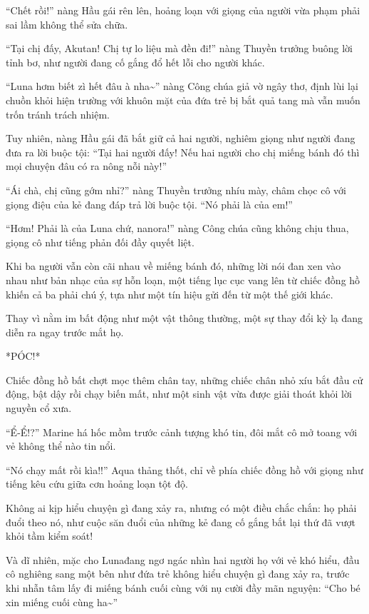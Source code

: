 \documentclass[../main.tex]{subfiles}
\begin{document}
``Chết rồi!'' nàng Hầu gái rên lên, hoảng loạn với giọng của người vừa phạm phải sai lầm không thể sửa chữa.

``Tại chị đấy, Akutan! Chị tự lo liệu mà đền đi!'' nàng Thuyền trưởng buông lời tỉnh bơ, như người đang cố gắng đổ hết lỗi cho người khác.

``Luna hơm biết zì hết đâu à nha\~{}'' nàng Công chúa giả vờ ngây thơ, định lùi lại chuồn khỏi hiện trường với khuôn mặt của đứa trẻ bị bắt quả tang mà vẫn muốn trốn tránh trách nhiệm.

Tuy nhiên, nàng Hầu gái đã bắt giữ cả hai người, nghiêm giọng như người đang đưa ra lời buộc tội: ``Tại hai người đấy! Nếu hai người cho chị miếng bánh đó thì mọi chuyện đâu có ra nông nỗi này!''

``Ái chà, chị cũng gớm nhỉ?'' nàng Thuyền trưởng nhíu mày, châm chọc cô với giọng điệu của kẻ đang đáp trả lời buộc tội. ``Nó phải là của em!''

``Hơm! Phải là của Luna chứ, nanora!'' nàng Công chúa cũng không chịu thua, giọng cô như tiếng phản đối đầy quyết liệt.

Khi ba người vẫn còn cãi nhau về miếng bánh đó, những lời nói đan xen vào nhau như bản nhạc của sự hỗn loạn, một tiếng lục cục vang lên từ chiếc đồng hồ khiến cả ba phải chú ý, tựa như một tín hiệu gửi đến từ một thế giới khác.

Thay vì nằm im bất động như một vật thông thường, một sự thay đổi kỳ lạ đang diễn ra ngay trước mắt họ.

*PÓC!*

Chiếc đồng hồ bất chợt mọc thêm chân tay, những chiếc chân nhỏ xíu bắt đầu cử động, bật dậy rồi chạy biến mất, như một sinh vật vừa được giải thoát khỏi lời nguyền cổ xưa.

``Ể-Ể!?'' Marine há hốc mồm trước cảnh tượng khó tin, đôi mắt cô mở toang với vẻ không thể nào tin nổi.

``Nó chạy mất rồi kìa!!'' Aqua thảng thốt, chỉ về phía chiếc đồng hồ với giọng như tiếng kêu cứu giữa cơn hoảng loạn tột độ.

Không ai kịp hiểu chuyện gì đang xảy ra, nhưng có một điều chắc chắn: họ phải đuổi theo nó, như cuộc săn đuổi của những kẻ đang cố gắng bắt lại thứ đã vượt khỏi tầm kiểm soát!


Và dĩ nhiên, mặc cho Lunađang ngơ ngác nhìn hai người họ với vẻ khó hiểu, đầu cô nghiêng sang một bên như đứa trẻ không hiểu chuyện gì đang xảy ra, trước khi nhẫn tâm lấy đi miếng bánh cuối cùng với nụ cười đầy mãn nguyện: ``Cho bé xin miếng cuối cùng ha\~{}''
\end{document}
